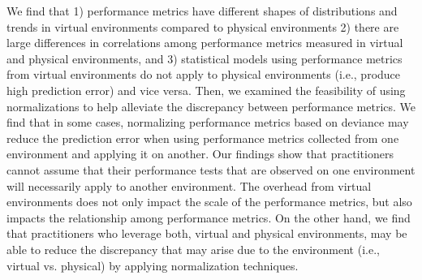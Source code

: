 We find that 1) performance metrics have different shapes of distributions and trends in virtual environments compared to physical environments 2) there are large differences in correlations among performance metrics measured in virtual and physical environments, and 3) statistical models using performance metrics from virtual environments do not apply to physical environments (i.e., produce high prediction error) and vice versa. Then, we examined the feasibility of using normalizations to help alleviate the discrepancy between performance metrics. We find that in some cases, normalizing performance metrics based on deviance may reduce the prediction error when using performance metrics collected from one environment and applying it on another. Our findings show that practitioners cannot assume that their performance tests that are observed on one environment will necessarily apply to another environment. The overhead from virtual environments does not only impact the scale of the performance metrics, but also impacts the relationship among performance metrics. On the other hand, we find that practitioners who leverage both, virtual and physical environments, may be able to reduce the discrepancy that may arise due to the environment (i.e., virtual vs. physical) by applying normalization techniques.








